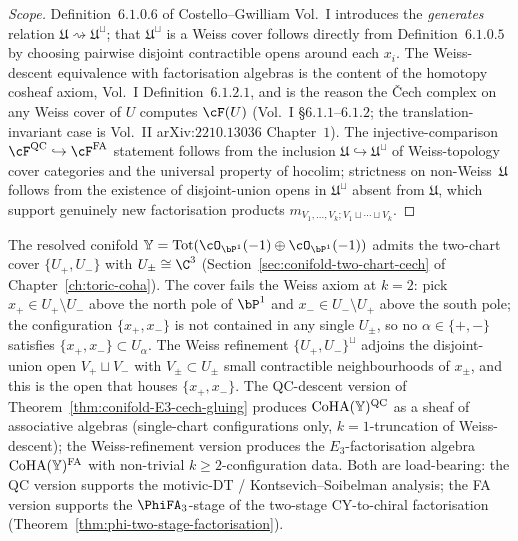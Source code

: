 \begin{proof}[Scope]
Definition~$6.1.0.6$ of Costello--Gwilliam Vol.~I introduces the \emph{generates} relation $\mathfrak U \rightsquigarrow \mathfrak U^\sqcup$; that $\mathfrak U^\sqcup$ is a Weiss cover follows directly from Definition~$6.1.0.5$ by choosing pairwise disjoint contractible opens around each $x_i$. The Weiss-descent equivalence with factorisation algebras is the content of the homotopy cosheaf axiom, Vol.~I Definition~$6.1.2.1$, and is the reason the Čech complex on any Weiss cover of $U$ computes $\cF(U)$ \textup{(}Vol.~I \S$6.1.1$--$6.1.2$; the translation-invariant case is Vol.~II arXiv:$2210.13036$ Chapter~$1$\textup{).} The injective-comparison $\cF^{\mathrm{QC}} \hookrightarrow \cF^{\mathrm{FA}}$ statement follows from the inclusion $\mathfrak U \hookrightarrow \mathfrak U^\sqcup$ of Weiss-topology cover categories and the universal property of hocolim; strictness on non-Weiss~$\mathfrak U$ follows from the existence of disjoint-union opens in $\mathfrak U^\sqcup$ absent from $\mathfrak U$, which support genuinely new factorisation products $m_{V_1, \ldots, V_k; V_1 \sqcup \cdots \sqcup V_k}$.
\end{proof}

\begin{remark}
\label{rem:resolved-conifold-weiss}
The resolved conifold $\bY = \mathrm{Tot}(\cO_{\bP^1}(-1) \oplus \cO_{\bP^1}(-1))$ admits the two-chart cover $\{U_+, U_-\}$ with $U_\pm \cong \C^3$ \textup{(}Section~\ref{sec:conifold-two-chart-cech} of Chapter~\ref{ch:toric-coha}\textup{).} The cover fails the Weiss axiom at $k = 2$: pick $x_+ \in U_+ \setminus U_-$ above the north pole of $\bP^1$ and $x_- \in U_- \setminus U_+$ above the south pole; the configuration $\{x_+, x_-\}$ is not contained in any single $U_\pm$, so no $\alpha \in \{+, -\}$ satisfies $\{x_+, x_-\} \subset U_\alpha$. The Weiss refinement $\{U_+, U_-\}^\sqcup$ adjoins the disjoint-union open $V_+ \sqcup V_-$ with $V_\pm \subset U_\pm$ small contractible neighbourhoods of $x_\pm$, and this is the open that houses $\{x_+, x_-\}$. The QC-descent version of Theorem~\ref{thm:conifold-E3-cech-gluing} produces $\mathrm{CoHA}(\mathbb{Y})^{\mathrm{QC}}$ as a sheaf of associative algebras \textup{(}single-chart configurations only, $k = 1$-truncation of Weiss-descent\textup{);} the Weiss-refinement version produces the $E_3$-factorisation algebra $\mathrm{CoHA}(\mathbb{Y})^{\mathrm{FA}}$ with non-trivial $k \geq 2$-configuration data. Both are load-bearing: the QC version supports the motivic-DT / Kontsevich--Soibelman analysis; the FA version supports the $\PhiFA_3$-stage of the two-stage CY-to-chiral factorisation \textup{(}Theorem~\ref{thm:phi-two-stage-factorisation}\textup{).}
\end{remark}

